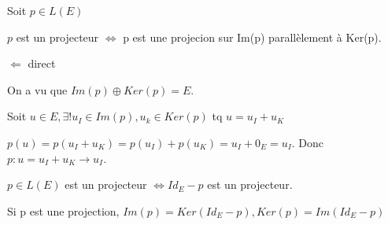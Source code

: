 \documentclass[french]{yLectureNote}
\begin{document}
\begin{proposition}[Corollaire]
Soit \(p\in L(E)\)

\(p\) est un projecteur \(\iff\) p est une projecion sur Im(p) parallèlement à Ker(p).
\end{proposition}
\begin{myproof}
 $\Leftarrow$ direct

 On a vu que $Im(p)\oplus Ker(p)= E$.

 Soit $u\in E, \exists! u_I\in Im(p), u_k \in Ker(p)$ tq $u=u_I+u_K$

 $p(u) = p(u_I+u_K) = p(u_I) + p(u_K) = u_I+0_E = u_I$. Donc $p : u = u_I+u_K \to u_I$.
\end{myproof}
\begin{proposition}
\(p\in L(E)\) est un projecteur \(\iff Id_E-p\) est un projecteur.
\end{proposition}
\begin{proposition}[Corollaire]
Si p est une projection, \(Im(p) = Ker(Id_E-p), Ker(p) = Im(Id_E-p)\)
\end{proposition}
\end{document}
